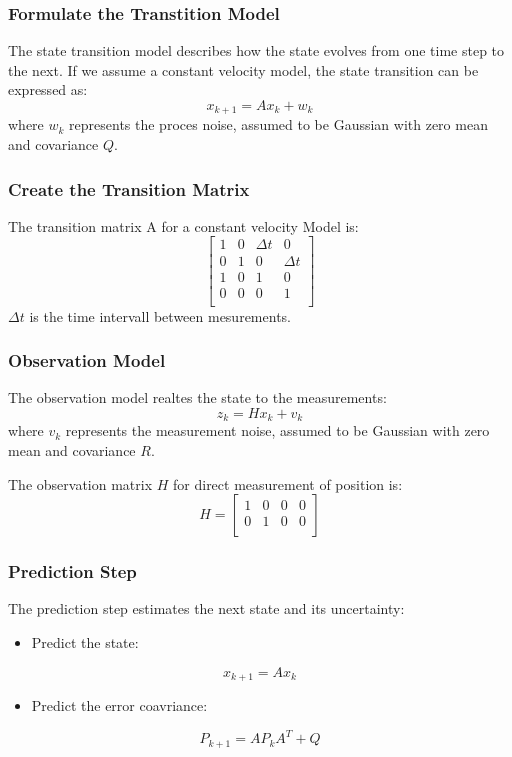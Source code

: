 \documentclass{beamer}
\begin{document}
\begin{frame}
    \frametitle{Formulate the Transtition Model}
    The state transition model describes how the state evolves from one time step to the next. 
    If we assume a constant velocity model, the state transition can be expressed as:
    \[x_{k+1}=Ax_{k}+w_{k}\]
    where \(w_{k}\) represents the proces noise, assumed to be Gaussian with zero mean and covariance \(Q\).
\end{frame}

\begin{frame}
    \frametitle{Create the Transition Matrix}
    The transition matrix A for a constant velocity Model is: 
    \[
        \left[ \begin{array}{rrrr}
            1 & 0 & \Delta t & 0        \\
            0 & 1 & 0        & \Delta t \\
            1 & 0 & 1        & 0        \\
            0 & 0 & 0        & 1        \\
        \end{array}\right]    
    \]
    \(\Delta t\) is the time intervall between mesurements.
\end{frame}

\begin{frame}
    \frametitle{Observation Model}
    The observation model realtes the state to the measurements:
    \[z_{k}=Hx_{k}+v_{k}\]
    where \(v_{k}\) represents the measurement noise, assumed to be Gaussian with zero mean and
    covariance \(R\).

    The observation matrix \(H\) for direct measurement of position is:
    \[H = \left[
        \begin{array}{rrrr}
            1 & 0 & 0 & 0 \\
            0 & 1 & 0 & 0 \\
        \end{array}
    \right]\]
\end{frame}

\begin{frame}
    \frametitle{Prediction Step}
    The prediction step estimates the next state and its uncertainty:
    \begin{itemize}
        \item Predict the state:
    \end{itemize}
    \[x_{k+1}=Ax_{k}\]
    \begin{itemize}
        \item Predict the error coavriance:
    \end{itemize}
    \[P_{k+1}=AP_{k}A^{T}+Q\]
\end{frame}
\end{document}

